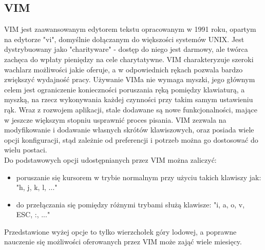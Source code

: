 \documentclass[12pt, a4paper]{article}
\begin{document}
\begin{sloppypar}
{  \subsection{VIM}
  {
    VIM jest zaawansowanym edytorem tekstu opracowanym w 1991 roku, opartym na edytorze
    "vi", domyślnie dołączanym do większości systemów UNIX. Jest dystrybuowany jako
    "charityware" - dostęp do niego jest darmowy, ale twórca zachęca do wpłaty pieniędzy
    na cele charytatywne. VIM charakteryzuje szeroki wachlarz możliwości jakie oferuje,
    a w odpowiednich rękach pozwala bardzo zwiększyć wydajność pracy. Używanie VIMa
    nie wymaga myszki, jego głównym celem jest ograniczenie konieczności poruszania ręką
    pomiędzy klawiaturą, a myszką, na rzecz wykonywania każdej czynności przy takim samym
    ustawieniu rąk. Wraz z rozwojem aplikacji, stale dodawane są nowe funkcjonalności,
    mające w jeszcze większym stopniu usprawnić proces pisania. VIM zezwala na
    modyfikowanie i dodawanie własnych skrótów klawiszowych, oraz posiada wiele opcji
    konfiguracji, stąd zależnie od preferencji i potrzeb można go dostosować do wielu
    postaci.\\
    Do podstawowych opcji udostępnianych przez VIM można zaliczyć:
    \begin{itemize}
      \item poruszanie się kursorem w trybie normalnym przy użyciu takich klawiszy jak:\\
      "h, j, k, l, ..."
      \item do przełączania się pomiędzy różnymi trybami służą klawisze:
      "i, a, o, v, ESC, :, ..."
    \end{itemize}
    Przedstawione wyżej opcje to tylko wierzchołek góry lodowej, a poprawne nauczenie
    się możliwości oferowanych przez VIM może zająć wiele miesięcy.
  }
}


\end{sloppypar}
\end{document}
